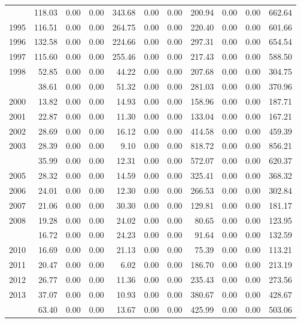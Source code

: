 \begin{longtable}[t]{rrrrrrrrrrr}
\addlinespace
1994 & 118.03 & 0.00 & 0.00 & 343.68 & 0.00 & 0.00 & 200.94 & 0.00 & 0.00 & 662.64\\
1995 & 116.51 & 0.00 & 0.00 & 264.75 & 0.00 & 0.00 & 220.40 & 0.00 & 0.00 & 601.66\\
1996 & 132.58 & 0.00 & 0.00 & 224.66 & 0.00 & 0.00 & 297.31 & 0.00 & 0.00 & 654.54\\
1997 & 115.60 & 0.00 & 0.00 & 255.46 & 0.00 & 0.00 & 217.43 & 0.00 & 0.00 & 588.50\\
1998 & 52.85 & 0.00 & 0.00 & 44.22 & 0.00 & 0.00 & 207.68 & 0.00 & 0.00 & 304.75\\
\addlinespace
1999 & 38.61 & 0.00 & 0.00 & 51.32 & 0.00 & 0.00 & 281.03 & 0.00 & 0.00 & 370.96\\
2000 & 13.82 & 0.00 & 0.00 & 14.93 & 0.00 & 0.00 & 158.96 & 0.00 & 0.00 & 187.71\\
2001 & 22.87 & 0.00 & 0.00 & 11.30 & 0.00 & 0.00 & 133.04 & 0.00 & 0.00 & 167.21\\
2002 & 28.69 & 0.00 & 0.00 & 16.12 & 0.00 & 0.00 & 414.58 & 0.00 & 0.00 & 459.39\\
2003 & 28.39 & 0.00 & 0.00 & 9.10 & 0.00 & 0.00 & 818.72 & 0.00 & 0.00 & 856.21\\
\addlinespace
2004 & 35.99 & 0.00 & 0.00 & 12.31 & 0.00 & 0.00 & 572.07 & 0.00 & 0.00 & 620.37\\
2005 & 28.32 & 0.00 & 0.00 & 14.59 & 0.00 & 0.00 & 325.41 & 0.00 & 0.00 & 368.32\\
2006 & 24.01 & 0.00 & 0.00 & 12.30 & 0.00 & 0.00 & 266.53 & 0.00 & 0.00 & 302.84\\
2007 & 21.06 & 0.00 & 0.00 & 30.30 & 0.00 & 0.00 & 129.81 & 0.00 & 0.00 & 181.17\\
2008 & 19.28 & 0.00 & 0.00 & 24.02 & 0.00 & 0.00 & 80.65 & 0.00 & 0.00 & 123.95\\
\addlinespace
2009 & 16.72 & 0.00 & 0.00 & 24.23 & 0.00 & 0.00 & 91.64 & 0.00 & 0.00 & 132.59\\
2010 & 16.69 & 0.00 & 0.00 & 21.13 & 0.00 & 0.00 & 75.39 & 0.00 & 0.00 & 113.21\\
2011 & 20.47 & 0.00 & 0.00 & 6.02 & 0.00 & 0.00 & 186.70 & 0.00 & 0.00 & 213.19\\
2012 & 26.77 & 0.00 & 0.00 & 11.36 & 0.00 & 0.00 & 235.43 & 0.00 & 0.00 & 273.56\\
2013 & 37.07 & 0.00 & 0.00 & 10.93 & 0.00 & 0.00 & 380.67 & 0.00 & 0.00 & 428.67\\
\addlinespace
2014 & 63.40 & 0.00 & 0.00 & 13.67 & 0.00 & 0.00 & 425.99 & 0.00 & 0.00 & 503.06\\

\end{longtable}
